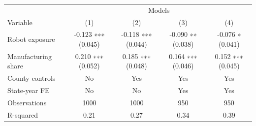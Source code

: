 \begin{table}[htbp]
\centering
\begin{tabular}{lcccc}
\hline
 & \multicolumn{4}{c}{Models} \\
Variable & (1) & (2) & (3) & (4) \\
Robot exposure & -0.123 ∗∗∗ (0.045) & -0.118 ∗∗∗ (0.044) & -0.090 ∗∗ (0.038) & -0.076 ∗ (0.041) \\
Manufacturing share & 0.210 ∗∗∗ (0.052) & 0.185 ∗∗∗ (0.048) & 0.164 ∗∗∗ (0.046) & 0.152 ∗∗∗ (0.045) \\
County controls & No & Yes & Yes & Yes \\
State-year FE & No & No & Yes & Yes \\
Observations & 1000 & 1000 & 950 & 950 \\
R-squared & 0.21 & 0.27 & 0.34 & 0.39 \\
\hline
\end{tabular}
\end{table}
